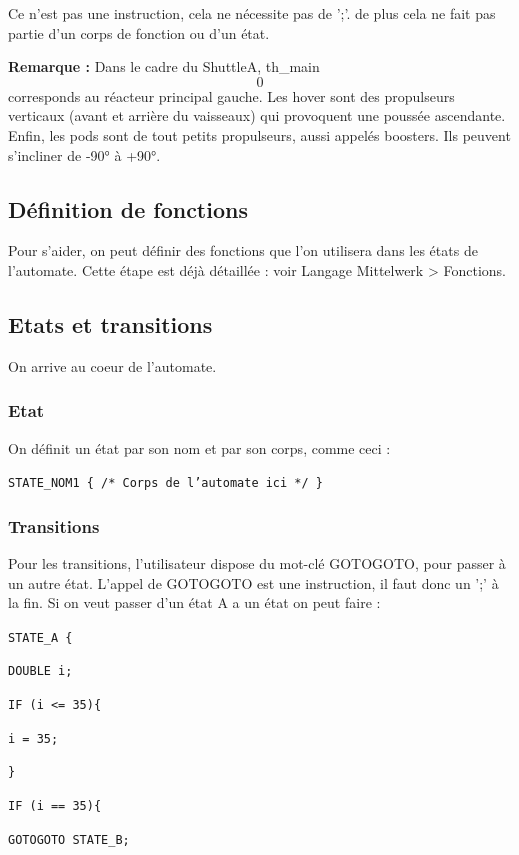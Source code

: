 \documentclass[a4paper,11pt]{article}
\begin{document}
Ce n'est pas une instruction, cela ne nécessite pas de ';'. de plus cela ne fait pas partie d'un corps de fonction ou d'un état.

\textbf{Remarque : }Dans le cadre du ShuttleA, th\_main\[0\] corresponds au réacteur principal gauche. 
Les hover sont des propulseurs verticaux (avant et arrière du vaisseaux) qui provoquent une poussée ascendante. Enfin, les pods sont de tout petits propulseurs, aussi appelés boosters. Ils peuvent s'incliner de -90° à +90°.

\subsection{Définition de fonctions}
Pour s'aider, on peut définir des fonctions que l'on utilisera dans les états de l'automate. Cette étape est déjà détaillée : voir Langage Mittelwerk > Fonctions.

\subsection{Etats et transitions}

On arrive au coeur de l'automate. 
\subsubsection{Etat}

On définit un état par son nom et par son corps, comme ceci :

\texttt{STATE\_NOM1 \{
	/* Corps de l'automate ici */
\}}

\subsubsection{Transitions}
Pour les transitions, l'utilisateur dispose du mot-clé GOTOGOTO, pour passer à un autre état. L'appel de GOTOGOTO est une instruction, il faut donc un ';' à la fin. 
Si on veut passer d'un état A a un état on peut faire : 
\newline

\texttt{STATE\_A \{}

\texttt{\quad DOUBLE i;}
			
\texttt{\quad	IF (i <= 35)\{}
	
\texttt{\qquad i = 35;}
			
\texttt{\quad \}}
	
\texttt{\quad IF (i == 35)\{}
	
\texttt{\qquad GOTOGOTO STATE\_B; }
		
\end{document}
